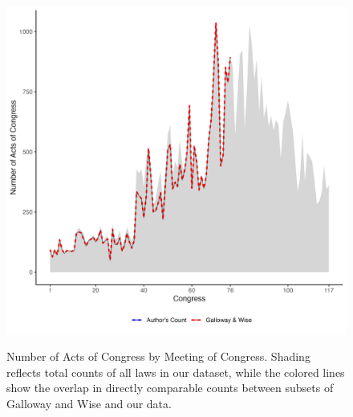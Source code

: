 \documentclass[fleqn,10pt]{wlscirep}
\begin{document}
\begin{figure}[h]
  \centering
  \caption{Number of Acts of Congress by Meeting of Congress. Shading reflects total counts of all laws in our dataset, while the colored lines show the overlap in directly comparable counts between subsets of Galloway and Wise and our data.}
  \includegraphics[width=\linewidth]{draft/figures/counts_of_laws_revised.png}
    \label{fig:totals}
\end{figure}




\end{document}
